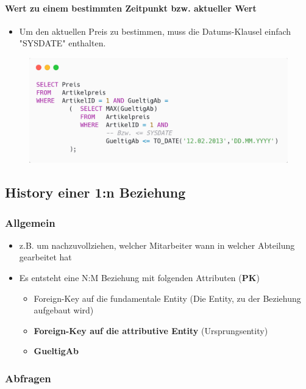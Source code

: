 \paragraph{Wert zu einem bestimmten Zeitpunkt bzw. aktueller Wert}
\begin{itemize}
    \item Um den aktuellen Preis zu bestimmen, muss die Datums-Klausel einfach "SYSDATE" enthalten.
\end{itemize}
\begin{figure}[H]
    \centering
    \includegraphics[width=\textwidth]{res/themenkorb_4/history_attribute.png}
\end{figure}

\subsection{History einer 1:n Beziehung}
\subsubsection{Allgemein}
\begin{itemize}
    \item z.B. um nachzuvollziehen, welcher Mitarbeiter wann in welcher Abteilung gearbeitet hat
    \item Es entsteht eine N:M Beziehung mit folgenden Attributen (\textbf{PK})
    \begin{itemize}
        \item Foreign-Key auf die fundamentale Entity (Die Entity, zu der Beziehung aufgebaut wird)
        \item \textbf{Foreign-Key auf die attributive Entity} (Ursprungsentity)
        \item \textbf{GueltigAb}
    \end{itemize}
\end{itemize}
\subsubsection{Abfragen}
